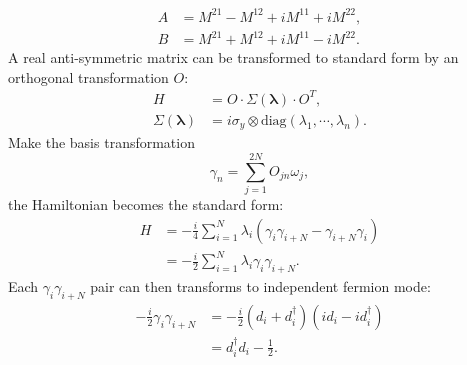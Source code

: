 \begin{equation}
\begin{aligned}
	A &= M^{21} - M^{12} + i M^{11} + i M^{22}, \\
	B &= M^{21} + M^{12} + i M^{11} - i M^{22}.
	\label{eq:lattice-majorana-bilinear-to-fermion}
\end{aligned}
\end{equation}
A real anti-symmetric matrix can be transformed to standard form by an orthogonal transformation $O$:
\begin{equation}
\begin{aligned}
	H &= O \cdot \Sigma(\bm \lambda) \cdot O^T, \\
	\Sigma(\bm \lambda) &= i\sigma_y \otimes \mathrm{diag}(\lambda_1,\cdots,\lambda_n).
\end{aligned}
\end{equation}
Make the basis transformation
\begin{equation}
	\gamma_n = \sum_{j=1}^{2N} O_{jn} \omega_j,
\end{equation}
the Hamiltonian becomes the standard form:
\begin{equation}
\begin{aligned}
	H &= -\frac{i}{4} \sum_{i=1}^N \lambda_i (\gamma_i \gamma_{i+N}-\gamma_{i+N} \gamma_i) \\
	&= -\frac{i}{2} \sum_{i=1}^N \lambda_i \gamma_i \gamma_{i+N}.
\end{aligned}
\end{equation}
Each $\gamma_i \gamma_{i+N}$ pair can then transforms to independent fermion mode:
\begin{equation}
\begin{aligned}
	-\frac{i}{2}\gamma_i \gamma_{i+N} 
	&= -\frac{i}{2}(d_i + d_i^\dagger)(id_i-id_i^\dagger) \\ 
	&= d_i^\dagger d_i-\frac{1}{2}.
\end{aligned}
\end{equation}



